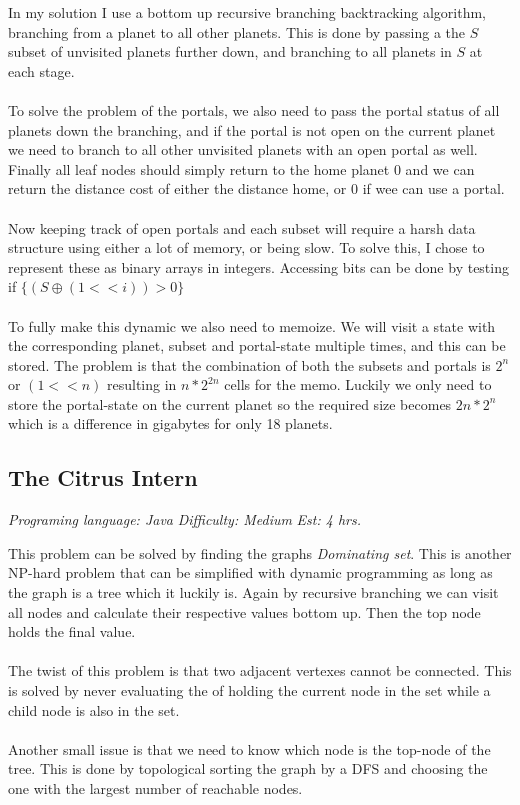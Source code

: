 \documentclass[a4paper, 12pt]{article}
\newcommand{\Problem}[4]{\subsection*{#1} \addcontentsline{toc}{subsection}{#1}
\centerline{\textit{Programing language: #2} \quad \textit{Difficulty: #3} \quad \textit{Est: #4 hrs.}}}
\begin{document}
	In my solution I use a bottom up recursive branching backtracking algorithm, branching from a planet to all other planets. This is done by passing a the $S$ subset of unvisited planets further down, and branching to all planets in $S$ at each stage. 
	\\\\
	To solve the problem of the portals, we also need to pass the portal status of all planets down the branching, and if the portal is not open on the current planet we need to branch to all other unvisited planets with an open portal as well. Finally all leaf nodes should simply return to the home planet $0$ and we can return the distance cost of either the distance home, or $0$ if wee can use a portal.
	\\\\
	Now keeping track of open portals and each subset will require a harsh data structure using either a lot of memory, or being slow. To solve this, I chose to represent these as binary arrays in integers. Accessing bits can be done by testing if $\{(S \oplus (1 << i)) > 0 \}$
	\\\\
	To fully make this dynamic we also need to memoize. We will visit a state with the corresponding planet, subset and portal-state multiple times, and this can be stored. The problem is that the combination of both the subsets and portals is $2^n$ or $(1 << n)$ resulting in $n * 2^{2n}$ cells for the memo. Luckily we only need to store the portal-state on the current planet so the required size becomes $2n * 2^n$ which is a difference in gigabytes for only 18 planets.
	
	\Problem{The Citrus Intern}{Java}{Medium}{4}
	This problem can be solved by finding the graphs \textit{Dominating set}. This is another NP-hard problem that can be simplified with dynamic programming as long as the graph is a tree which it luckily is. Again by recursive branching we can visit all nodes and calculate their respective values bottom up. Then the top node holds the final value.
	\\\\
	The twist of this problem is that two adjacent vertexes cannot be connected. This is solved by never evaluating the of holding the current node in the set while a child node is also in the set.
	\\\\
	Another small issue is that we need to know which node is the top-node of the tree. This is done by topological sorting the graph by a DFS and choosing the one with the largest number of reachable nodes.
\end{document}
